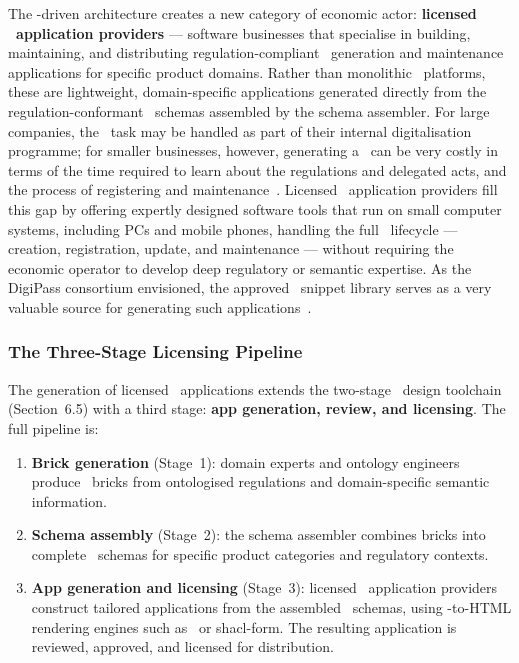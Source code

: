 The \SHACL-driven architecture creates a new category of economic actor:
\textbf{licensed \DPP\ application providers} --- software businesses that
specialise in building, maintaining, and distributing regulation-compliant \DPP\
generation and maintenance applications for specific product domains. Rather
than monolithic \DPP\ platforms, these are lightweight, domain-specific
applications generated directly from the regulation-conformant \SHACL\ schemas
assembled by the schema assembler. For large
companies, the \DPP\ task may be handled as part of their internal
digitalisation programme; for smaller businesses, however, generating a \DPP\
can be very costly in terms of the time required to learn about the regulations
and delegated acts, and the process of registering and
maintenance~\cite{dpp4eu2026_postconf}. Licensed \DPP\ application providers
fill this gap by offering expertly designed software tools that run on small
computer systems, including PCs and mobile phones, handling the full \DPP\
lifecycle --- creation, registration, update, and maintenance --- without
requiring the economic operator to develop deep regulatory or semantic
expertise. As the DigiPass consortium envisioned, the approved \SHACL\ snippet
library serves as a very valuable source for generating such
applications~\cite{dpp4eu2026_postconf}.

\subsubsection{The Three-Stage Licensing Pipeline}

The generation of licensed \DPP\ applications extends the two-stage \SHACL\
design toolchain (Section~6.5) with a third stage: \textbf{app generation,
review, and licensing}. The full pipeline is:

\begin{enumerate}
\item \textbf{Brick generation} (Stage~1): domain experts and ontology engineers
produce \SHACL\ bricks from ontologised regulations and domain-specific semantic
information.
\item \textbf{Schema assembly} (Stage~2): the schema assembler combines bricks
into complete \SHACL\ schemas for specific product categories and regulatory
contexts.
\item \textbf{App generation and licensing} (Stage~3): licensed \DPP\
application providers construct tailored applications from the assembled \SHACL\
schemas, using \SHACL-to-HTML rendering engines such as \DASH\ or shacl-form.
The resulting application is reviewed, approved, and licensed for distribution.
\end{enumerate}

